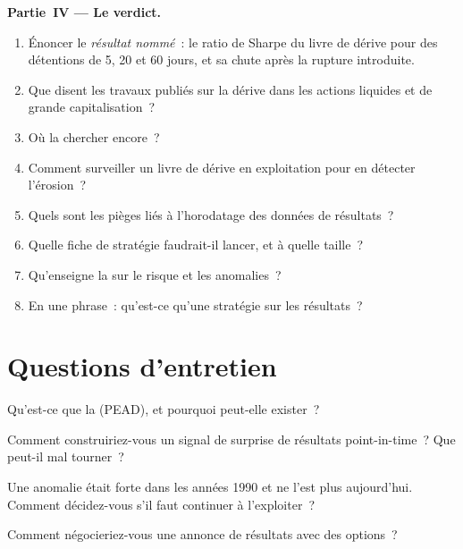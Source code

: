 \begin{problem}
\medskip\noindent\textbf{Partie~IV --- Le verdict.}
\begin{enumerate}[resume]
\item Énoncer le \emph{résultat nommé}~: le ratio de Sharpe du livre de dérive pour des détentions de 5, 20 et 60 jours, et sa chute après la rupture introduite.
\item Que disent les travaux publiés sur la dérive dans les actions liquides et de grande capitalisation~?
\item Où la chercher encore~?
\item Comment surveiller un livre de dérive en exploitation pour en détecter l'érosion~?
\item Quels sont les pièges liés à l'horodatage des données de résultats~?
\item Quelle fiche de stratégie faudrait-il lancer, et à quelle taille~?
\item Qu'enseigne la  sur le risque et les anomalies~?
\item En une phrase~: qu'est-ce qu'une stratégie sur les résultats~?
\end{enumerate}
\end{problem}

\section{Questions d'entretien}

\begin{interviewq}\label{iq:s1:earnings:1}
Qu'est-ce que la  (PEAD), et pourquoi peut-elle exister~?
\end{interviewq}

\begin{interviewq}\label{iq:s1:earnings:2}
Comment construiriez-vous un signal de surprise de résultats point-in-time~? Que peut-il mal tourner~?
\end{interviewq}

\begin{interviewq}\label{iq:s1:earnings:3}
Une anomalie était forte dans les années 1990 et ne l'est plus aujourd'hui. Comment décidez-vous s'il faut continuer à l'exploiter~?
\end{interviewq}

\begin{interviewq}\label{iq:s1:earnings:4}
Comment négocieriez-vous une annonce de résultats avec des options~?
\end{interviewq}

